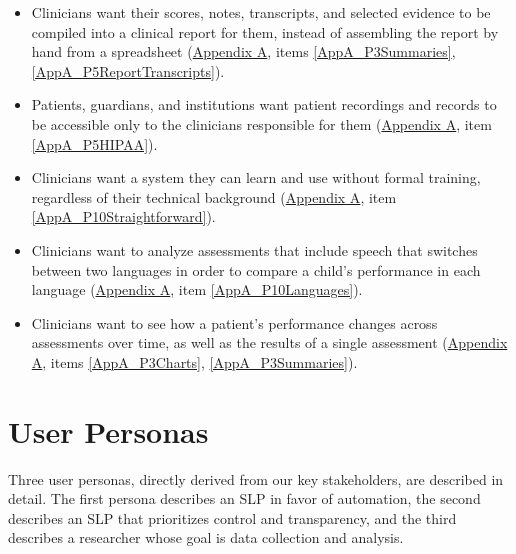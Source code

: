 \documentclass[12pt]{article}
\newcounter{srnum} %
\begin{document}
\begin{itemize}
\item[\textbf{SR\thesrnum}] \label{SR_CompiledReports} Clinicians want their scores, notes, transcripts, and selected evidence to be compiled into a clinical report for them, instead of assembling the report by hand from a spreadsheet (\hyperref[sec:AppendixA]{Appendix A}, items \ref{AppA_P3Summaries}, \ref{AppA_P5ReportTranscripts}).

\item[\textbf{SR\thesrnum}] \label{SR_PatientPrivacy} Patients, guardians, and institutions want patient recordings and records to be accessible only to the clinicians responsible for them (\hyperref[sec:AppendixA]{Appendix A}, item \ref{AppA_P5HIPAA}).

\item[\textbf{SR\thesrnum}] \label{SR_LowLearningCurve} Clinicians want a system they can learn and use without formal training, regardless of their technical background (\hyperref[sec:AppendixA]{Appendix A}, item \ref{AppA_P10Straightforward}).

\item[\textbf{SR\thesrnum}] \label{SR_BilingualSupport} Clinicians want to analyze assessments that include speech that switches between two languages in order to compare a child’s performance in each language (\hyperref[sec:AppendixA]{Appendix A}, item \ref{AppA_P10Languages}).

\item[\textbf{SR\thesrnum}] \label{SR_ProgressOverTime} Clinicians want to see how a patient’s performance changes across assessments over time, as well as the results of a single assessment (\hyperref[sec:AppendixA]{Appendix A}, items \ref{AppA_P3Charts}, \ref{AppA_P3Summaries}).

\end{itemize}

\section{User Personas} \label{sec:UserPersonas}

Three user personas, directly derived from our key stakeholders, are described in detail. The first persona describes an SLP in favor of automation, the second describes an SLP that prioritizes control and transparency, and the third describes a researcher whose goal is data collection and analysis.
\end{document}

